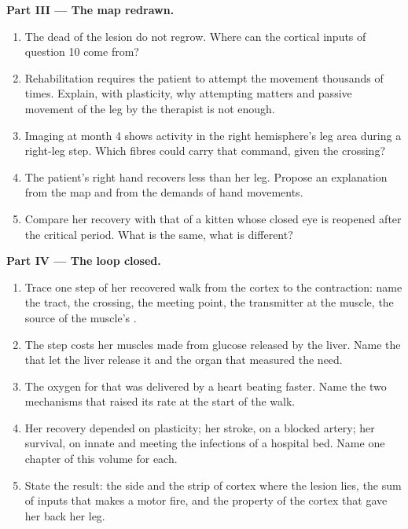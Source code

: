\begin{problem}
\medskip
\noindent\textbf{Part III --- The map redrawn.}
\begin{enumerate}[resume]
  \item The dead  of the lesion do not regrow. Where can the
        cortical inputs of question 10 come from?
  \item Rehabilitation requires the patient to attempt the movement
        thousands of times. Explain, with plasticity, why attempting
        matters and passive movement of the leg by the therapist is
        not enough.
  \item Imaging at month 4 shows activity in the right hemisphere's
        leg area during a right-leg step. Which fibres could carry
        that command, given the crossing?
  \item The patient's right hand recovers less than her leg. Propose
        an explanation from the map and from the demands of hand
        movements.
  \item Compare her recovery with that of a kitten whose closed eye
        is reopened after the critical period. What is the same, what
        is different?
\end{enumerate}

\medskip
\noindent\textbf{Part IV --- The loop closed.}
\begin{enumerate}[resume]
  \item Trace one step of her recovered walk from the cortex to the
        contraction: name the tract, the crossing, the meeting point,
        the transmitter at the muscle, the source of the muscle's .
  \item The step costs her muscles  made from glucose released by
        the liver. Name the  that let the liver release it and
        the organ that measured the need.
  \item The oxygen for that  was delivered by a heart beating
        faster. Name the two mechanisms that raised its rate at the
        start of the walk.
  \item Her recovery depended on plasticity; her stroke, on a blocked
        artery; her survival, on innate and  meeting
        the infections of a hospital bed. Name one chapter of this
        volume for each.
  \item State the result: the side and the strip of cortex where the
        lesion lies, the sum of inputs that makes a motor  fire,
        and the property of the cortex that gave her back her leg.
\end{enumerate}
\end{problem}
